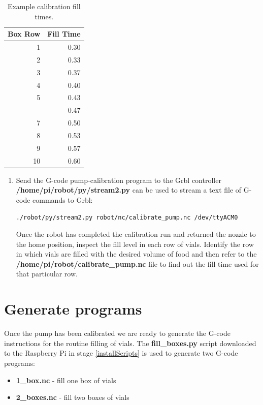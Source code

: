 \documentclass[]{book}
\providecommand{\tightlist}{%
  \setlength{\itemsep}{0pt}\setlength{\parskip}{0pt}}
\theoremstyle{definition}
\theoremstyle{definition}
\theoremstyle{remark}
\begin{document}
\begin{table}

\caption{\label{tab:calibrationFillTimes}Example calibration fill times.}
\centering
\begin{tabular}[t]{rr}
\toprule
Box Row & Fill Time\\
\midrule
1 & 0.30\\
2 & 0.33\\
3 & 0.37\\
4 & 0.40\\
5 & 0.43\\
\addlinespace
6 & 0.47\\
7 & 0.50\\
8 & 0.53\\
9 & 0.57\\
10 & 0.60\\
\bottomrule
\end{tabular}
\end{table}

\begin{enumerate}
\def\labelenumi{\arabic{enumi}.}
\setcounter{enumi}{3}
\item
  Send the G-code pump-calibration program to the Grbl controller
  \textbf{/home/pi/robot/py/stream2.py} can be used to stream a text
  file of G-code commands to Grbl:

\begin{verbatim}
./robot/py/stream2.py robot/nc/calibrate_pump.nc /dev/ttyACM0
\end{verbatim}

  Once the robot has completed the calibration run and returned the
  nozzle to the home position, inspect the fill level in each row of
  vials. Identify the row in which vials are filled with the desired
  volume of food and then refer to the
  \textbf{/home/pi/robot/calibrate\_pump.nc} file to find out the fill
  time used for that particular row.
\end{enumerate}

\section{Generate programs}\label{generate-programs}

Once the pump has been calibrated we are ready to generate the G-code
instructions for the routine filling of vials. The
\textbf{fill\_boxes.py} script downloaded to the Raspberry Pi in stage
\ref{installScripts} is used to generate two G-code programs:

\begin{itemize}
\tightlist
\item
  \textbf{1\_box.nc} - fill one box of vials
\item
  \textbf{2\_boxes.nc} - fill two boxes of vials
\end{itemize}
\end{document}
